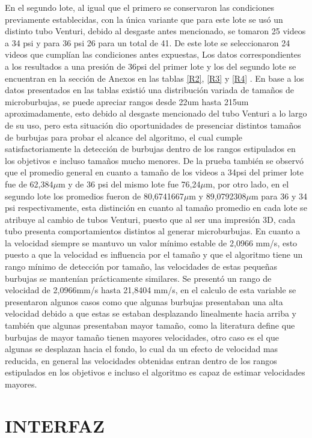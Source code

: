 \documentclass[12pt,twocolumn,a4paper]{article}
\begin{document}
En el segundo lote, al igual que el primero se conservaron las condiciones previamente establecidas, con la única variante que para este lote se usó un distinto tubo Venturi, debido al desgaste antes mencionado, se tomaron 25 videos a 34 psi y para 36 psi 26 para un total de 41. De este lote se seleccionaron 24 videos que cumplían las condiciones antes expuestas, Los datos correspondientes a los resultados a una presión de 36psi del primer lote y los del segundo lote se encuentran en la sección de Anexos en las tablas \ref{R2}, \ref{R3} y \ref{R4} .
En base a los datos presentados en las tablas existió una distribución variada de tamaños de microburbujas, se puede apreciar rangos desde  22um hasta 215um aproximadamente, esto debido al desgaste mencionado del tubo Venturi a lo largo de su uso, pero esta situación dio oportunidades de presenciar distintos tamaños de burbujas para probar el alcance del algoritmo, el cual cumple satisfactoriamente la detección de burbujas dentro de los rangos estipulados en los objetivos e incluso tamaños mucho menores. De la prueba también se observó que el promedio general en cuanto a tamaño de los videos a 34psi del primer lote fue de 62,384$\mu$m y de 36 psi del mismo lote fue 76,24$\mu$m, por otro lado, en el segundo lote los promedios fueron de 80,6741667$\mu$m y 89,0792308$\mu$m para 36 y 34 psi respectivamente, esta distinción en cuanto al tamaño promedio en cada lote se atribuye al cambio de tubos Venturi, puesto que al ser una impresión 3D, cada tubo presenta comportamientos distintos al generar microburbujas.
En cuanto a la velocidad siempre se mantuvo un valor mínimo estable de 2,0966 mm/s, esto puesto a que la velocidad es influencia por el tamaño y que el algoritmo tiene un rango mínimo de detección por tamaño, las velocidades de estas pequeñas burbujas se mantenían prácticamente similares. Se presentó un rango de velocidad de 2,0966mm/s hasta 21,8404 mm/s, en el calculo de esta variable se presentaron algunos casos como que algunas burbujas presentaban una alta velocidad debido a que estas se estaban desplazando linealmente hacia arriba y también que algunas presentaban mayor tamaño, como la literatura define que burbujas de mayor tamaño tienen mayores velocidades, otro caso es el que algunas se desplazan hacia el fondo, lo cual da un efecto de velocidad mas reducida, en general las velocidades obtenidas entran dentro de los rangos estipulados en los objetivos e incluso el algoritmo es capaz de estimar velocidades mayores.

\section{INTERFAZ}
\end{document}
